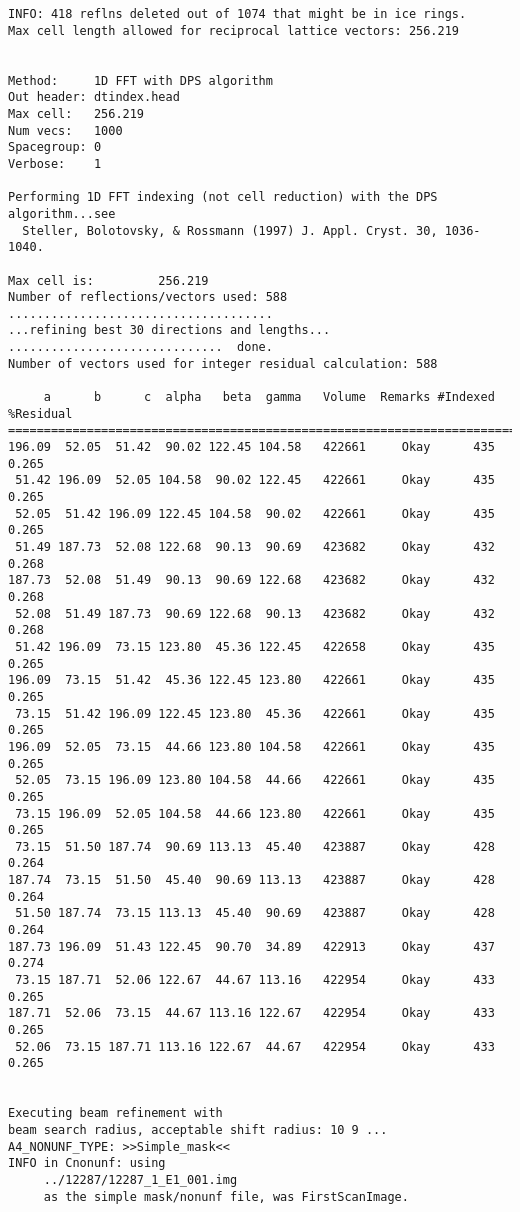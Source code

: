 \documentclass[a4paper, 11pt]{article}
\begin{document}
{\begin{verbatim}
INFO: 418 reflns deleted out of 1074 that might be in ice rings.
Max cell length allowed for reciprocal lattice vectors: 256.219


Method:     1D FFT with DPS algorithm
Out header: dtindex.head
Max cell:   256.219
Num vecs:   1000
Spacegroup: 0
Verbose:    1

Performing 1D FFT indexing (not cell reduction) with the DPS algorithm...see
  Steller, Bolotovsky, & Rossmann (1997) J. Appl. Cryst. 30, 1036-1040.

Max cell is:         256.219
Number of reflections/vectors used: 588
.....................................
...refining best 30 directions and lengths...
..............................  done.
Number of vectors used for integer residual calculation: 588

     a      b      c  alpha   beta  gamma   Volume  Remarks #Indexed %Residual
==============================================================================
196.09  52.05  51.42  90.02 122.45 104.58   422661     Okay      435     0.265
 51.42 196.09  52.05 104.58  90.02 122.45   422661     Okay      435     0.265
 52.05  51.42 196.09 122.45 104.58  90.02   422661     Okay      435     0.265
 51.49 187.73  52.08 122.68  90.13  90.69   423682     Okay      432     0.268
187.73  52.08  51.49  90.13  90.69 122.68   423682     Okay      432     0.268
 52.08  51.49 187.73  90.69 122.68  90.13   423682     Okay      432     0.268
 51.42 196.09  73.15 123.80  45.36 122.45   422658     Okay      435     0.265
196.09  73.15  51.42  45.36 122.45 123.80   422661     Okay      435     0.265
 73.15  51.42 196.09 122.45 123.80  45.36   422661     Okay      435     0.265
196.09  52.05  73.15  44.66 123.80 104.58   422661     Okay      435     0.265
 52.05  73.15 196.09 123.80 104.58  44.66   422661     Okay      435     0.265
 73.15 196.09  52.05 104.58  44.66 123.80   422661     Okay      435     0.265
 73.15  51.50 187.74  90.69 113.13  45.40   423887     Okay      428     0.264
187.74  73.15  51.50  45.40  90.69 113.13   423887     Okay      428     0.264
 51.50 187.74  73.15 113.13  45.40  90.69   423887     Okay      428     0.264
187.73 196.09  51.43 122.45  90.70  34.89   422913     Okay      437     0.274
 73.15 187.71  52.06 122.67  44.67 113.16   422954     Okay      433     0.265
187.71  52.06  73.15  44.67 113.16 122.67   422954     Okay      433     0.265
 52.06  73.15 187.71 113.16 122.67  44.67   422954     Okay      433     0.265


Executing beam refinement with
beam search radius, acceptable shift radius: 10 9 ...
A4_NONUNF_TYPE: >>Simple_mask<<
INFO in Cnonunf: using
     ../12287/12287_1_E1_001.img
     as the simple mask/nonunf file, was FirstScanImage.


\end{verbatim}}
\end{document}
